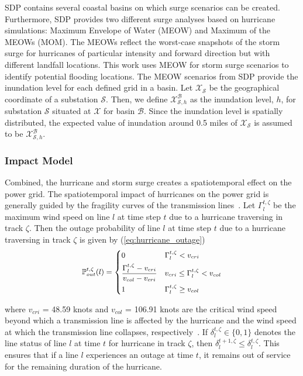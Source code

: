 SDP contains several coastal basins on which surge scenarios can be created. Furthermore, SDP provides two different surge analyses based on hurricane simulations: Maximum Envelope of Water (MEOW) and Maximum of the MEOWs (MOM). The MEOWs reflect the worst-case snapshots of the storm surge for hurricanes of particular intensity and forward direction but with different landfall locations. This work uses MEOW for storm surge scenarios to identify potential flooding locations. The MEOW scenarios from SDP provide the inundation level for each defined grid in a basin. Let $\mathcal{X}_\mathcal{S}$ be the geographical coordinate of a substation $\mathcal{S}$. Then, we define $\mathcal{X}^\mathcal{B}_{\mathcal{S}, h}$ as the inundation level, $h$, for substation $\mathcal{S}$ situated at $\mathcal{X}$ for basin $\mathcal{B}$. Since the inundation level is spatially distributed, the expected value of inundation around 0.5 miles of $\mathcal{X}_\mathcal{S}$ is assumed to be $\mathcal{X}^\mathcal{B}_{\mathcal{S}, h}$. 

\subsubsection{Impact Model}
Combined, the hurricane and storm surge creates a spatiotemporal effect on the power grid. The spatiotemporal impact of hurricanes on the power grid is generally guided by the fragility curves of the transmission lines~\cite{7801854}. Let $\Gamma_{l}^{t,\zeta}$ be the maximum wind speed on line $l$ at time step $t$ due to a hurricane traversing in track $\zeta$. Then the outage probability of line $l$ at time step $t$ due to a hurricane traversing in track $\zeta$ is given by (\ref{eq:hurricane_outage})      
\vspace{-1em}
\begin{equation}
\small
\begin{aligned}
&\mathbb{P}_{out}^{t,\zeta}(l)= \begin{dcases} 0 & \Gamma_{l}^{t,\zeta} < v_{cri} \\
\frac{\Gamma_{l}^{t,\zeta} - v_{cri}}{v_{col} - v_{cri}}  & v_{cri} \leq \Gamma_{l}^{t,\zeta} < v_{col} \\
1 & \Gamma_{l}^{t,\zeta} \geq v_{col} \end{dcases} \\
\end{aligned}
\label{eq:hurricane_outage}
\end{equation}

\noindent
where $v_{cri}$ = 48.59 knots and $v_{col}$ = 106.91 knots are the critical wind speed beyond which a transmission line is affected by the hurricane and the wind speed at which the transmission line collapses, respectively~\cite{9917119}. If $\delta_{l}^{t,\zeta} \in \{0,1\}$ denotes the line status of line $l$ at time $t$ for hurricane in track $\zeta$, then $\delta_{l}^{t + 1,\zeta} \leq  \delta_{l}^{t,\zeta}$. This ensures that if a line $l$ experiences an outage at time $t$, it remains out of service for the remaining duration of the hurricane.    


